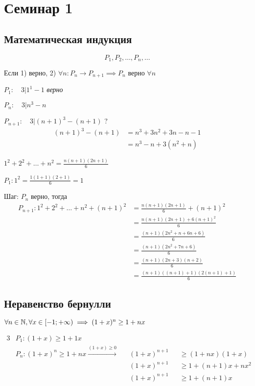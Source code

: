 \section{Семинар 1}

\subsection{Математическая индукция}
\[
	P_1, P_2, \dots, P_n, \dots
\]

Если 1) верно, 2) \( \forall n : P_n \rightarrow P_{n + 1} \implies P_n \) верно \( \forall n \) 

\( P_1 : \quad 3 | 1^1 - 1 \) \textit{верно}

\( P_n : \quad 3 | n^3 - n \)

\( P_{n + 1} : \quad 3 | (n + 1)^3 - (n + 1) \) ?
\begin{align*}
	(n + 1)^3 - (n + 1) &= n^3 + 3n^2 + 3n - n - 1 \\
	&= n^3 - n + 3(n^2 + n)
\end{align*}

\begin{problem}
	\( 1^2 + 2^2 + \dots + n^2 = \frac{n(n + 1)(2n + 1)}{6} \)
\end{problem}

\( P_1: 1^2 = \frac{1(1+1)(2+1)}{6} = 1\)

Шаг: \( P_n \) верно, тогда
\begin{align*}
	P_{n + 1} : 1^2 + 2^2 + \dots + n^2 + (n + 1)^2 
	&= \frac{n(n + 1)(2n + 1)}{6} + (n + 1)^2 \\
	&= \frac{n(n + 1)(2n + 1) + 6(n + 1)^2}{6} \\
	&= \frac{(n + 1)(2n^2 + n + 6n + 6)}{6} \\
	&= \frac{(n + 1)(2n^2 + 7n + 6)}{6} \\
	&= \frac{(n + 1)(2n + 3)(n + 2)}{6} \\
	&= \frac{(n + 1)((n + 1) + 1)(2(n + 1) + 1)}{6}
\end{align*}

\subsection{Неравенство бернулли}

\begin{problem}
	\( 
		\forall n \in \mathbb{N}, 
		\forall x \in [-1; +\infty) 
		\implies (1 + x)^n \geq 1 + nx 
	\)
\end{problem}
\begin{alignat*}{3}
	&P_1 : (1 + x) \geq 1 + 1 x \\
	&P_{n} : (1 + x)^{n} \geq 1 + nx 
	\xrightarrow{(1 + x) \geq 0}
	&&(1 + x)^{n + 1} && \geq (1 + nx)(1 + x) \\
	& &&(1 + x)^{n + 1} && \geq 1 + (n + 1)x + nx^2 \\
	& &&(1 + x)^{n + 1} && \geq 1 + (n + 1)x	
\end{alignat*}

